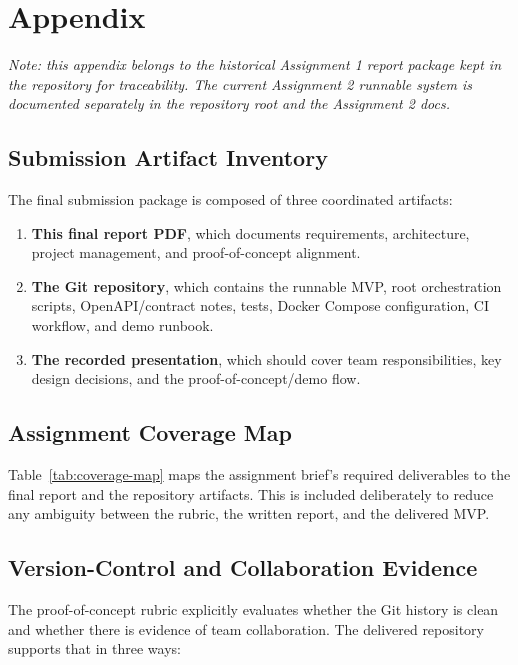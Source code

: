 \chapter{Appendix}

\textit{Note: this appendix belongs to the historical Assignment 1 report package kept in the repository for traceability. The current Assignment 2 runnable system is documented separately in the repository root and the Assignment 2 docs.}

\section{Submission Artifact Inventory}

The final submission package is composed of three coordinated artifacts:

\begin{enumerate}
  \item \textbf{This final report PDF}, which documents requirements, architecture, project management,
  and proof-of-concept alignment.
  \item \textbf{The Git repository}, which contains the runnable MVP, root orchestration scripts,
  OpenAPI/contract notes, tests, Docker Compose configuration, CI workflow, and demo runbook.
  \item \textbf{The recorded presentation}, which should cover team responsibilities, key design
  decisions, and the proof-of-concept/demo flow.
\end{enumerate}

\section{Assignment Coverage Map}

Table~\ref{tab:coverage-map} maps the assignment brief's required deliverables to the final report and the
repository artifacts. This is included deliberately to reduce any ambiguity between the rubric, the
written report, and the delivered MVP.



\section{Version-Control and Collaboration Evidence}

The proof-of-concept rubric explicitly evaluates whether the Git history is clean and whether there is
evidence of team collaboration. The delivered repository supports that in three ways:

